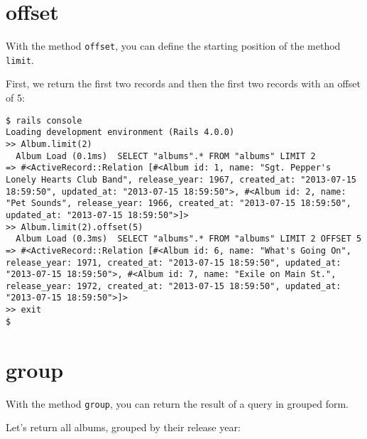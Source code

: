 \documentclass[a4paper]{book}
\begin{document}
\section{offset}\label{offset}

With the method \texttt{offset}, you can define the starting position of the method \texttt{limit}.

First, we return the first two records and then the first two records with an offset of 5:

\begin{shaded}\begin{verbatim}
$ rails console
Loading development environment (Rails 4.0.0)
>> Album.limit(2)
  Album Load (0.1ms)  SELECT "albums".* FROM "albums" LIMIT 2
=> #<ActiveRecord::Relation [#<Album id: 1, name: "Sgt. Pepper's Lonely Hearts Club Band", release_year: 1967, created_at: "2013-07-15 18:59:50", updated_at: "2013-07-15 18:59:50">, #<Album id: 2, name: "Pet Sounds", release_year: 1966, created_at: "2013-07-15 18:59:50", updated_at: "2013-07-15 18:59:50">]>
>> Album.limit(2).offset(5)
  Album Load (0.3ms)  SELECT "albums".* FROM "albums" LIMIT 2 OFFSET 5
=> #<ActiveRecord::Relation [#<Album id: 6, name: "What's Going On", release_year: 1971, created_at: "2013-07-15 18:59:50", updated_at: "2013-07-15 18:59:50">, #<Album id: 7, name: "Exile on Main St.", release_year: 1972, created_at: "2013-07-15 18:59:50", updated_at: "2013-07-15 18:59:50">]>
>> exit
$
\end{verbatim}\end{shaded}

\section{group}\label{group}

With the method \texttt{group}, you can return the result of a query in grouped form.

Let's return all albums, grouped by their release year:
\end{document}
